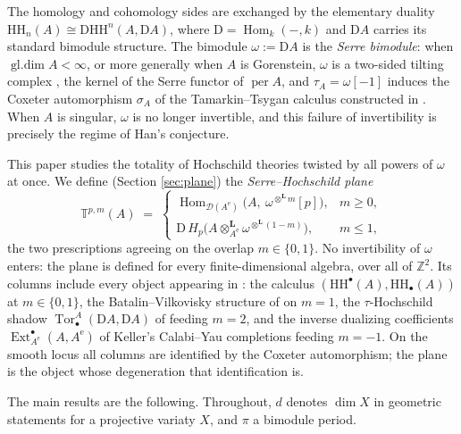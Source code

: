 \documentclass[11pt]{amsart}
\theoremstyle{definition}
\newcommand{\T}{\mathbb{T}}
\newcommand{\HH}{\mathrm{HH}}
\newcommand{\D}{\mathrm{D}}
\newcommand{\Ext}{\operatorname{Ext}}
\newcommand{\Tor}{\operatorname{Tor}}
\newcommand{\Hom}{\operatorname{Hom}}
\newcommand{\gl}{\operatorname{gl.dim}}
\newcommand{\Ae}{A^{\mathrm{e}}}
\newcommand{\der}{\mathcal{D}}
\newcommand{\per}{\operatorname{per}}
\newcommand{\Lotimes}{\otimes^{\mathbf{L}}}
\newcommand{\kk}{k}
\begin{document}
The homology and cohomology sides are exchanged by the elementary duality
$\HH_n(A)\cong\D\HH^n(A,\D A)$, where $\D=\Hom_\kk(-,\kk)$ and $\D A$ carries its
standard bimodule structure. The bimodule $\omega:=\D A$ is the
\emph{Serre bimodule}: when $\gl A<\infty$, or more generally when $A$ is
Gorenstein, $\omega$ is a two-sided tilting complex \cite{HappelGor}, the
kernel of the Serre functor of $\per A$, and $\tau_A=\omega[-1]$ induces the
Coxeter automorphism $\sigma_A$ of the Tamarkin--Tsygan calculus constructed
in \cite{ArmCox}. When $A$ is singular, $\omega$ is no longer invertible,
and this failure of invertibility is precisely the regime of Han's conjecture.

This paper studies the totality of Hochschild theories twisted by all powers
of $\omega$ at once. We define (Section \ref{sec:plane}) the
\emph{Serre--Hochschild plane}
\[
\T^{p,m}(A)\;=\;
\begin{cases}
\Hom_{\der(\Ae)}\bigl(A,\ \omega^{\Lotimes m}[p]\bigr), & m\ge 0,\\[2pt]
\D\,H_p\bigl(A\Lotimes_{\Ae}\omega^{\Lotimes(1-m)}\bigr), & m\le 1,
\end{cases}
\]
the two prescriptions agreeing on the overlap $m\in\{0,1\}$. No invertibility
of $\omega$ enters: the plane is defined for every finite-dimensional algebra,
over all of $\mathbb Z^2$. Its columns include every object appearing in
\cite{ArmCap,ArmCox,ArmTau,ArmPC,ArmLeb}: the calculus
$(\HH^\bullet(A),\HH_\bullet(A))$ at $m\in\{0,1\}$, the
Batalin--Vilkovisky structure of \cite{ArmLeb} on $m=1$, the
$\tau$-Hochschild shadow $\Tor^A_\bullet(\D A,\D A)$ of
\cite{ArmTau,CLMS-tau} feeding $m=2$, and the inverse dualizing coefficients
$\Ext^\bullet_{\Ae}(A,\Ae)$ of Keller's Calabi--Yau completions
\cite{KellerCY} feeding $m=-1$. On the smooth locus all columns are identified
by the Coxeter automorphism; the plane is the object whose degeneration that
identification is.

The main results are the following. Throughout, $d$ denotes $\dim X$ in
geometric statements for a projective variaty $X$, and $\pi$ a bimodule period.
\end{document}
